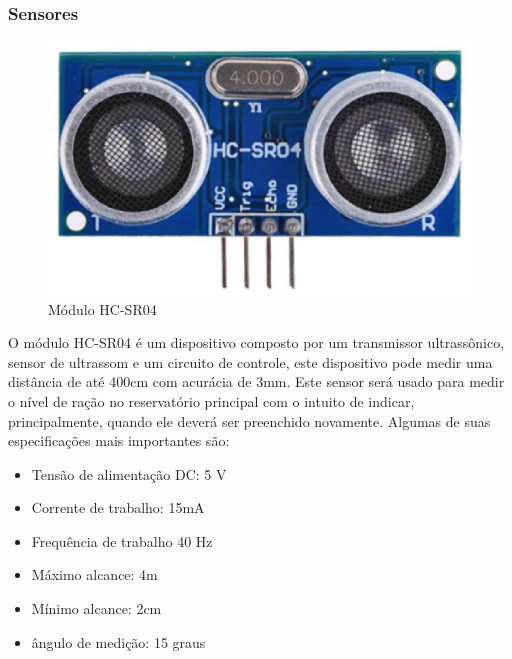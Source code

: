 \subsubsection{Sensores}

\begin{figure}[H]
 \centering
   \includegraphics[keepaspectratio=true,scale=0.8]{figuras/ultrason.eps}
 \caption{Módulo HC-SR04}
 \label{ultrason}
\end{figure}

O módulo HC-SR04 é um dispositivo composto por um transmissor ultrassônico, sensor de ultrassom e um circuito de controle, este dispositivo pode medir uma distância de até 400cm com acurácia de 3mm. Este sensor será usado para medir o nível de ração no reservatório principal com o intuito de indicar, principalmente, quando ele deverá ser preenchido novamente. Algumas de suas especificações  mais importantes são:

\begin{itemize}
\item Tensão de alimentação DC: 5 V
\item Corrente de trabalho: 15mA
\item Frequência de trabalho 40 Hz
\item Máximo alcance: 4m
\item Mínimo alcance: 2cm
\item ângulo de medição: 15 graus
\end{itemize}


